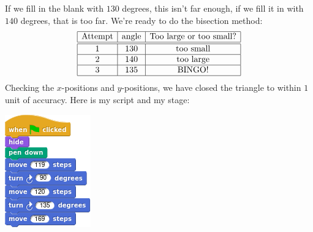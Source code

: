 \documentclass[noauthor,nooutcomes,handout,12pt]{ximera}
\begin{document}
\begin{question}
\begin{freeResponse}
\begin{description}
\begin{center}
        \end{center}
        If we fill in the blank with $130$ degrees, this isn't far
        enough, if we fill it in with $140$ degrees, that is too
        far. We're ready to do the bisection method:
        \[
        \begin{array}{|c|c|c|c|}\hline
          \text{Attempt} & \text{angle} & \text{Too large or too small?} \\ \hline\hline
          1 & 130 & \text{too small} \\ \hline
          2 & 140 & \text{too large}  \\ \hline
          3 & 135 & \text{BINGO!}  \\ \hline
        \end{array}
        \]
        Checking the $x$-positions and $y$-positions, we have closed
        the triangle to within $1$ unit of accuracy. Here is my script and my stage:
        \begin{center}
          \includegraphics[width=.3\textwidth]{119120169-script.png}   \qquad {}
        \end{center}






\end{description}
\end{freeResponse}
\end{question}
\end{document}
